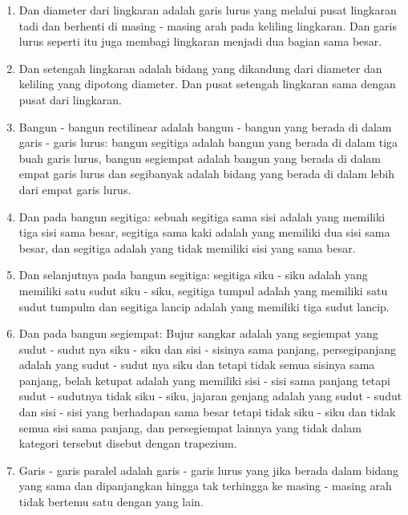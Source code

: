 \documentclass[a4paper]{book}
\begin{document}
\begin{enumerate}
\item Dan diameter dari lingkaran adalah garis lurus yang melalui 
pusat lingkaran tadi dan berhenti di masing - masing arah pada
keliling lingkaran. Dan garis lurus seperti itu juga membagi lingkaran 
menjadi dua bagian sama besar.
\item Dan setengah lingkaran adalah bidang yang dikandung dari diameter dan 
keliling yang dipotong diameter. Dan pusat setengah lingkaran sama dengan 
pusat dari lingkaran.
\item Bangun - bangun rectilinear adalah bangun - bangun yang berada di dalam
garis - garis lurus: bangun segitiga adalah bangun yang berada di dalam tiga buah
garis lurus, bangun segiempat adalah bangun yang berada di dalam empat garis lurus dan 
segibanyak adalah bidang yang berada di dalam lebih dari empat garis lurus.
\item Dan pada bangun segitiga: sebuah segitiga sama sisi adalah yang memiliki tiga
sisi sama besar, segitiga sama kaki adalah yang memiliki dua sisi sama besar, dan 
segitiga adalah yang tidak memiliki sisi yang sama besar.
\item Dan selanjutnya pada bangun segitiga: segitiga siku - siku adalah yang memiliki
satu sudut siku - siku, segitiga tumpul adalah yang memiliki satu sudut tumpulm dan 
segitiga lancip adalah yang memiliki tiga sudut lancip.
\item Dan pada bangun segiempat: Bujur sangkar adalah yang segiempat yang
sudut - sudut nya siku - siku dan sisi - sisinya sama panjang, persegipanjang
adalah yang sudut - sudut nya siku dan tetapi tidak semua sisinya sama panjang, 
belah ketupat adalah yang memiliki sisi - sisi sama panjang tetapi
sudut - sudutnya tidak siku - siku, jajaran genjang adalah yang sudut - sudut 
dan sisi - sisi yang berhadapan sama besar tetapi tidak siku - siku dan tidak 
semua sisi sama panjang, dan persegiempat lainnya yang tidak dalam kategori tersebut
disebut dengan trapezium.
\item Garis - garis paralel adalah garis - garis lurus yang jika berada dalam 
bidang yang sama dan dipanjangkan hingga tak terhingga ke masing - masing arah
tidak bertemu satu dengan yang lain.  
\end{enumerate}
\end{document}
